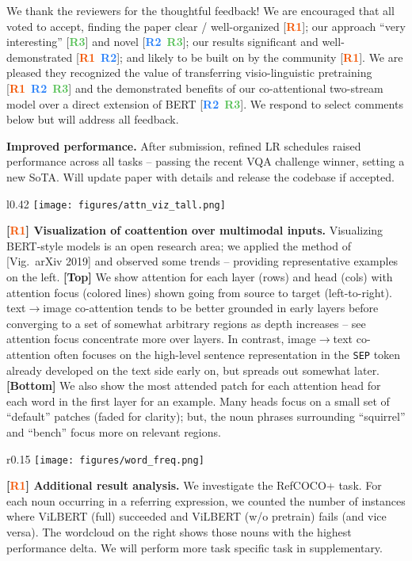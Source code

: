 \documentclass{article}
\newcommand{\xhdr}[1]{\vspace{0pt}\noindent\textbf{#1}}
\newcommand{\one}{\textbf{\textcolor[HTML]{f35400}{R1}}}
\newcommand{\two}{\textbf{\textcolor[HTML]{2980f9}{R2}}}
\newcommand{\three}{\textbf{\textcolor[HTML]{55c055}{R3}}}
\renewcommand{\xhdr}[1]{\noindent \textbf{#1}}
\begin{document}
We thank the reviewers for the thoughtful feedback! We are encouraged that all voted to accept, finding the paper clear / well-organized [\one]; our approach ``very interesting'' [\three] and novel [\two~\three]; our results significant and well-demonstrated [\one~\two]; and likely to be built on by the community [\one]. We are pleased they recognized the value of transferring visio-linguistic pretraining [\one~\two~\three] and the demonstrated benefits of our co-attentional two-stream model over a direct extension of BERT [\two~\three]. We respond to select comments below but will address all feedback.





\xhdr{Improved performance.} After submission, refined LR schedules raised performance across all tasks -- passing the recent VQA challenge winner, setting a new SoTA. Will update paper with details and release the codebase if accepted.
\begin{wrapfigure}{l}{0.42\textwidth}
\vspace{-14pt}
\texttt{[image: figures/attn\_viz\_tall.png]} 
\vspace{-20pt}
\end{wrapfigure}

\vspace{-10pt}\xhdr{[\one] Visualization of coattention over multimodal inputs.} Visualizing BERT-style models is an open research area; we applied the method of [Vig.~arXiv 2019] and observed some trends -- providing representative examples on the left. 
\textbf{[Top]} We show attention for each layer (rows) and head (cols) with attention focus (colored lines) shown going from source to target (left-to-right). text$\rightarrow$image co-attention tends to be better grounded in early layers before converging to a set of somewhat arbitrary regions as depth increases -- see attention focus concentrate more over layers. In contrast, image$\rightarrow$text co-attention often focuses on the high-level sentence representation in the \texttt{SEP} token already developed on the text side 
early on, but spreads out somewhat later. \textbf{[Bottom]} We also show the most attended patch for each attention head for each word in the first layer for an example. Many heads focus on a small set of ``default'' patches (faded for clarity); but, the noun phrases surrounding ``squirrel'' and ``bench'' focus more on relevant regions. 

\begin{wrapfigure}{r}{0.15\textwidth}
\vspace{-15pt}
\texttt{[image: figures/word\_freq.png]} 
\vspace{-20pt}
\end{wrapfigure}
\xhdr{[\one] Additional result analysis.} We investigate the RefCOCO+ task. For each noun occurring in a referring expression, we counted the number of instances where ViLBERT (full) succeeded and ViLBERT (w/o pretrain) fails (and vice versa). The wordcloud on the right shows those nouns with the highest performance delta. We will perform more task specific task in supplementary.
\end{document}
